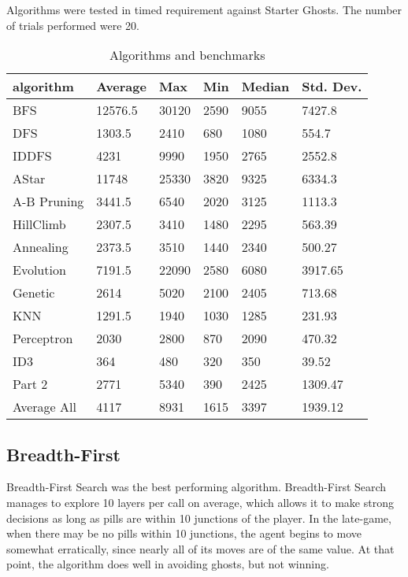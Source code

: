 \documentclass[a4paper]{article}
\begin{document}
Algorithms were tested in timed requirement against Starter Ghosts. The number of trials performed were 20.\newline
\begin{table}[h]
\begin{center}
  \caption{Algorithms and benchmarks}
\begin{tabular}{ l | l  l l l l}
  \hline			
algorithm &	Average &	Max &	Min &	Median &	Std. Dev.\\ \hline
BFS &	12576.5 &	30120 &	2590 &	9055 &	7427.8 \\
DFS &	1303.5 &	2410 &	680 &	1080 &	554.7 \\
IDDFS &	4231 &	9990 &	1950 &	2765 &	2552.8 \\
AStar &	11748 &	25330 &	3820 &	9325 &	6334.3 \\
A-B Pruning &	3441.5 &	6540 &	2020 &	3125 &	1113.3 \\
HillClimb &	2307.5 &	3410 &	1480 &	2295 &	563.39 \\
Annealing &	2373.5 &	3510 &	1440 &	2340 &	500.27 \\
Evolution &	7191.5 &	22090 &	2580 &	6080 &	3917.65 \\
Genetic &	2614 &	5020 &	2100 &	2405 &	713.68 \\
KNN &	1291.5 &	1940 &	1030 &	1285 &	231.93 \\
Perceptron&2030&2800&870&2090 &470.32 \\
ID3 &364&480 &	320 &350 &39.52\\ 
Part 2 &	2771 &	5340 &	390 &	2425 &	1309.47 \\\hline
Average All & 4117 & 8931 &	1615 & 3397 & 1939.12\\ 
\end{tabular}
\end{center}
\end{table}

\subsection{Breadth-First}
Breadth-First Search was the best performing algorithm. Breadth-First Search manages to explore 10 layers per call on average, which allows it to make strong decisions as long as pills are within 10 junctions of the player.  In the late-game, when there may be no pills within 10 junctions, the agent begins to move somewhat erratically, since nearly all of its moves are of the same value.  At that point, the algorithm does well in avoiding ghosts, but not winning. 
\end{document}
